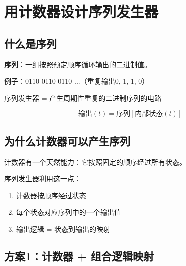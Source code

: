 \chapter{用计数器设计序列发生器}

\section{什么是序列}

\textbf{序列}：一组按照预定顺序循环输出的二进制值。

例子：0110 0110 0110 ...（重复输出0, 1, 1, 0）

\begin{keypoint}[序列发生器的本质]
序列发生器 = 产生周期性重复的二进制序列的电路

$$\text{输出}(t) = \text{序列}[\text{内部状态}(t)]$$
\end{keypoint}

\section{为什么计数器可以产生序列}

计数器有一个天然能力：它按照固定的顺序经过所有状态。

序列发生器利用这一点：
\begin{enumerate}
  \item 计数器按顺序经过状态
  \item 每个状态对应序列中的一个输出值
  \item 输出逻辑 = 状态到输出的映射
\end{enumerate}

\begin{center}
\end{center}

\section{方案1：计数器 + 组合逻辑映射}

